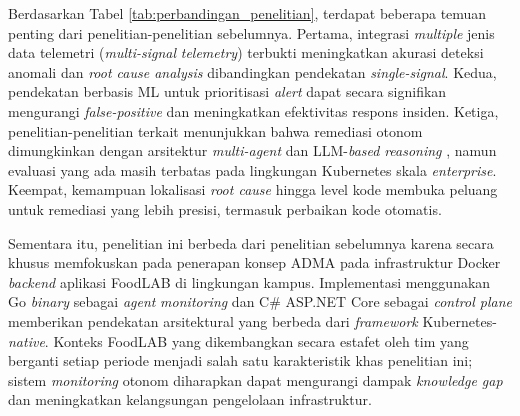 Berdasarkan Tabel \ref{tab:perbandingan_penelitian}, terdapat beberapa temuan penting dari penelitian-penelitian sebelumnya. Pertama, integrasi \textit{multiple} jenis data telemetri (\textit{multi-signal} \textit{telemetry}) terbukti meningkatkan akurasi deteksi anomali dan \textit{root cause analysis} dibandingkan pendekatan \textit{single-signal}. Kedua, pendekatan berbasis ML untuk prioritisasi \textit{alert} dapat secara signifikan mengurangi \textit{false-positive} dan meningkatkan efektivitas respons insiden. Ketiga, penelitian-penelitian terkait menunjukkan bahwa remediasi otonom dimungkinkan dengan arsitektur \textit{multi-agent} dan LLM-\textit{based} \textit{reasoning} \cite{fu2025leveraging}, namun evaluasi yang ada masih terbatas pada lingkungan Kubernetes skala \textit{enterprise}. Keempat, kemampuan lokalisasi \textit{root cause} hingga level kode membuka peluang untuk remediasi yang lebih presisi, termasuk perbaikan kode otomatis.

Sementara itu, penelitian ini berbeda dari penelitian sebelumnya karena secara khusus memfokuskan pada penerapan konsep ADMA pada infrastruktur Docker \textit{backend} aplikasi FoodLAB di lingkungan kampus. Implementasi menggunakan Go \textit{binary} sebagai \textit{agent} \textit{monitoring} dan C\# ASP.NET Core sebagai \textit{control plane} memberikan pendekatan arsitektural yang berbeda dari \textit{framework} Kubernetes-\textit{native}. Konteks FoodLAB yang dikembangkan secara estafet oleh tim yang berganti setiap periode menjadi salah satu karakteristik khas penelitian ini; sistem \textit{monitoring} otonom diharapkan dapat mengurangi dampak \textit{knowledge gap} dan meningkatkan kelangsungan pengelolaan infrastruktur.
